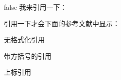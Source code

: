 \documentclass[12pt]{article} %
\begin{document}
	\if false
	我来引用一下：\cite{Jr2006A,银温泉2001我国地方市场分割的成因和治理}
	
	引用一下才会下面的参考文献中显示：
	
	
	
	\fi
	
	无格式化引用 \cite{aa}

	带方括号的引用 \parencite{aa}
	
	上标引用 \supercite{aa}
	
	\printbibliography[title={参考文献}]
	
\end{document}
